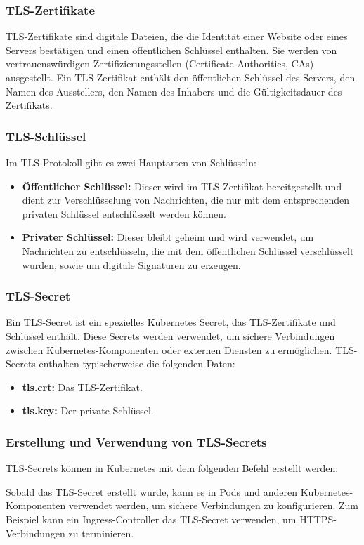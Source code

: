 \subsubsection{TLS-Zertifikate}
TLS-Zertifikate sind digitale Dateien, die die Identität einer Website oder eines Servers bestätigen und einen öffentlichen Schlüssel enthalten. Sie werden von vertrauenswürdigen Zertifizierungsstellen (Certificate Authorities, CAs) ausgestellt. Ein TLS-Zertifikat enthält den öffentlichen Schlüssel des Servers, den Namen des Ausstellers, den Namen des Inhabers und die Gültigkeitsdauer des Zertifikats. 

\subsubsection{TLS-Schlüssel}
Im TLS-Protokoll gibt es zwei Hauptarten von Schlüsseln:
\begin{itemize}
    \item \textbf{Öffentlicher Schlüssel:} Dieser wird im TLS-Zertifikat bereitgestellt und dient zur Verschlüsselung von Nachrichten, die nur mit dem entsprechenden privaten Schlüssel entschlüsselt werden können.
    \item \textbf{Privater Schlüssel:} Dieser bleibt geheim und wird verwendet, um Nachrichten zu entschlüsseln, die mit dem öffentlichen Schlüssel verschlüsselt wurden, sowie um digitale Signaturen zu erzeugen.
\end{itemize}

\subsubsection{TLS-Secret}
Ein TLS-Secret ist ein spezielles Kubernetes Secret, das TLS-Zertifikate und Schlüssel enthält. Diese Secrets werden verwendet, um sichere Verbindungen zwischen Kubernetes-Komponenten oder externen Diensten zu ermöglichen. TLS-Secrets enthalten typischerweise die folgenden Daten:
\begin{itemize}
    \item \textbf{tls.crt:} Das TLS-Zertifikat.
    \item \textbf{tls.key:} Der private Schlüssel.
\end{itemize}

\subsubsection{Erstellung und Verwendung von TLS-Secrets}
TLS-Secrets können in Kubernetes mit dem folgenden Befehl erstellt werden:

Sobald das TLS-Secret erstellt wurde, kann es in Pods und anderen Kubernetes-Komponenten verwendet werden, um sichere Verbindungen zu konfigurieren. Zum Beispiel kann ein Ingress-Controller das TLS-Secret verwenden, um HTTPS-Verbindungen zu terminieren.


